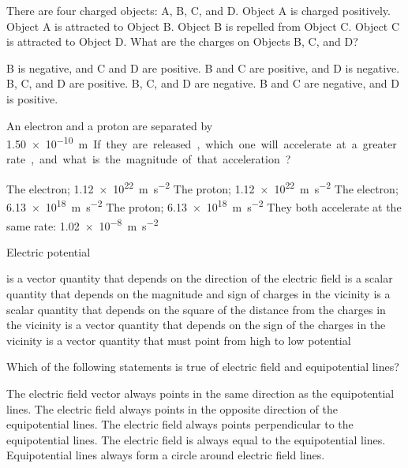 \documentclass{../../ossphysics}
\begin{document}

\begin{questions}

  \question There are four charged objects: A, B, C, and D. Object A is charged
  positively. Object A is attracted to Object B. Object B is repelled from
  Object C. Object C is attracted to Object D. What are the charges on
  Objects B, C, and D?
  \begin{choices}
    \choice B is negative, and C and D are positive.
    \choice B and C are positive, and D is negative.
    \choice B, C, and D are positive.
    \choice B, C, and D are negative.
    \choice B and C are negative, and D is positive.
  \end{choices}

  \question An electron and a proton are separated by \SI{1.50e-10}\metre. If
  they are released, which one will accelerate at a greater rate, and what is
  the magnitude of that acceleration?
  \begin{choices}
    \choice The electron; \SI{1.12e22}{\metre\per\second\squared}
    \choice The proton;   \SI{1.12e22}{\metre\per\second\squared}
    \choice The electron; \SI{6.13e18}{\metre\per\second\squared}
    \choice The proton;   \SI{6.13e18}{\metre\per\second\squared}
    \choice They both accelerate at the same rate:
    \SI{1.02e-8}{\metre\per\second\squared}
  \end{choices}

  \question Electric potential
  \begin{choices}
    \choice is a vector quantity that depends on the direction of the electric
    field
    \choice is a scalar quantity that depends on the magnitude and sign of
    charges in the vicinity
    \choice is a scalar quantity that depends on the square of the distance
    from the charges in the vicinity
    \choice is a vector quantity that depends on the sign of the charges in
    the vicinity
    \choice is a vector quantity that must point from high to low potential
  \end{choices}

  \question Which of the following statements is true of electric field and
  equipotential lines?
  \begin{choices}
    \choice The electric field vector always points in the same direction as
    the equipotential lines.
    \choice The electric field always points in the opposite direction of the
    equipotential lines.
    \choice The electric field always points perpendicular to the
    equipotential lines.
    \choice The electric field is always equal to the equipotential lines.
    \choice Equipotential lines always form a circle around electric field
    lines.
  \end{choices}


\end{questions}
\end{document}
